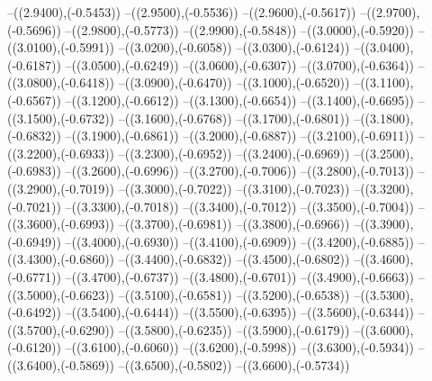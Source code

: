{	--({\sx*(2.9400)},{\sy*(-0.5453)})
	--({\sx*(2.9500)},{\sy*(-0.5536)})
	--({\sx*(2.9600)},{\sy*(-0.5617)})
	--({\sx*(2.9700)},{\sy*(-0.5696)})
	--({\sx*(2.9800)},{\sy*(-0.5773)})
	--({\sx*(2.9900)},{\sy*(-0.5848)})
	--({\sx*(3.0000)},{\sy*(-0.5920)})
	--({\sx*(3.0100)},{\sy*(-0.5991)})
	--({\sx*(3.0200)},{\sy*(-0.6058)})
	--({\sx*(3.0300)},{\sy*(-0.6124)})
	--({\sx*(3.0400)},{\sy*(-0.6187)})
	--({\sx*(3.0500)},{\sy*(-0.6249)})
	--({\sx*(3.0600)},{\sy*(-0.6307)})
	--({\sx*(3.0700)},{\sy*(-0.6364)})
	--({\sx*(3.0800)},{\sy*(-0.6418)})
	--({\sx*(3.0900)},{\sy*(-0.6470)})
	--({\sx*(3.1000)},{\sy*(-0.6520)})
	--({\sx*(3.1100)},{\sy*(-0.6567)})
	--({\sx*(3.1200)},{\sy*(-0.6612)})
	--({\sx*(3.1300)},{\sy*(-0.6654)})
	--({\sx*(3.1400)},{\sy*(-0.6695)})
	--({\sx*(3.1500)},{\sy*(-0.6732)})
	--({\sx*(3.1600)},{\sy*(-0.6768)})
	--({\sx*(3.1700)},{\sy*(-0.6801)})
	--({\sx*(3.1800)},{\sy*(-0.6832)})
	--({\sx*(3.1900)},{\sy*(-0.6861)})
	--({\sx*(3.2000)},{\sy*(-0.6887)})
	--({\sx*(3.2100)},{\sy*(-0.6911)})
	--({\sx*(3.2200)},{\sy*(-0.6933)})
	--({\sx*(3.2300)},{\sy*(-0.6952)})
	--({\sx*(3.2400)},{\sy*(-0.6969)})
	--({\sx*(3.2500)},{\sy*(-0.6983)})
	--({\sx*(3.2600)},{\sy*(-0.6996)})
	--({\sx*(3.2700)},{\sy*(-0.7006)})
	--({\sx*(3.2800)},{\sy*(-0.7013)})
	--({\sx*(3.2900)},{\sy*(-0.7019)})
	--({\sx*(3.3000)},{\sy*(-0.7022)})
	--({\sx*(3.3100)},{\sy*(-0.7023)})
	--({\sx*(3.3200)},{\sy*(-0.7021)})
	--({\sx*(3.3300)},{\sy*(-0.7018)})
	--({\sx*(3.3400)},{\sy*(-0.7012)})
	--({\sx*(3.3500)},{\sy*(-0.7004)})
	--({\sx*(3.3600)},{\sy*(-0.6993)})
	--({\sx*(3.3700)},{\sy*(-0.6981)})
	--({\sx*(3.3800)},{\sy*(-0.6966)})
	--({\sx*(3.3900)},{\sy*(-0.6949)})
	--({\sx*(3.4000)},{\sy*(-0.6930)})
	--({\sx*(3.4100)},{\sy*(-0.6909)})
	--({\sx*(3.4200)},{\sy*(-0.6885)})
	--({\sx*(3.4300)},{\sy*(-0.6860)})
	--({\sx*(3.4400)},{\sy*(-0.6832)})
	--({\sx*(3.4500)},{\sy*(-0.6802)})
	--({\sx*(3.4600)},{\sy*(-0.6771)})
	--({\sx*(3.4700)},{\sy*(-0.6737)})
	--({\sx*(3.4800)},{\sy*(-0.6701)})
	--({\sx*(3.4900)},{\sy*(-0.6663)})
	--({\sx*(3.5000)},{\sy*(-0.6623)})
	--({\sx*(3.5100)},{\sy*(-0.6581)})
	--({\sx*(3.5200)},{\sy*(-0.6538)})
	--({\sx*(3.5300)},{\sy*(-0.6492)})
	--({\sx*(3.5400)},{\sy*(-0.6444)})
	--({\sx*(3.5500)},{\sy*(-0.6395)})
	--({\sx*(3.5600)},{\sy*(-0.6344)})
	--({\sx*(3.5700)},{\sy*(-0.6290)})
	--({\sx*(3.5800)},{\sy*(-0.6235)})
	--({\sx*(3.5900)},{\sy*(-0.6179)})
	--({\sx*(3.6000)},{\sy*(-0.6120)})
	--({\sx*(3.6100)},{\sy*(-0.6060)})
	--({\sx*(3.6200)},{\sy*(-0.5998)})
	--({\sx*(3.6300)},{\sy*(-0.5934)})
	--({\sx*(3.6400)},{\sy*(-0.5869)})
	--({\sx*(3.6500)},{\sy*(-0.5802)})
	--({\sx*(3.6600)},{\sy*(-0.5734)})
}

